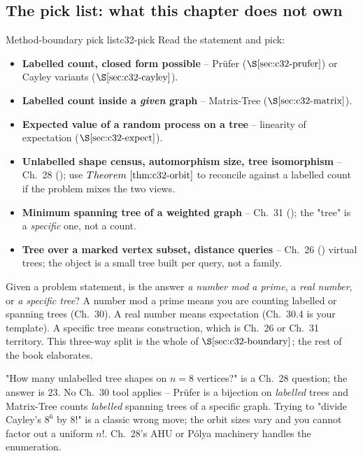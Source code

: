 \subsection{The pick list: what this chapter does not own}

\begin{definition}{Method-boundary pick list}{c32-pick}
Read the statement and pick:
\begin{itemize}[nosep]
  \item \textbf{Labelled count, closed form possible} -- Pr\"ufer
        (\(\secref{c32-prufer}\)) or Cayley variants
        (\(\secref{c32-cayley}\)).
  \item \textbf{Labelled count inside a \emph{given} graph} -- Matrix-Tree
        (\(\secref{c32-matrix}\)).
  \item \textbf{Expected value of a random process on a tree} -- linearity
        of expectation (\(\secref{c32-expect}\)).
  \item \textbf{Unlabelled shape census, automorphism size, tree isomorphism}
        -- Ch.~28 (); use \(\thmref{c32-orbit}\) to reconcile
        against a labelled count if the problem mixes the two views.
  \item \textbf{Minimum spanning tree of a weighted graph} -- Ch.~31
        (); the "tree" is a \emph{specific} one, not a count.
  \item \textbf{Tree over a marked vertex subset, distance queries} --
        Ch.~26 () virtual trees; the object is a small tree
        built per query, not a family.
\end{itemize}
\end{definition}

\begin{insightbox}
Given a problem statement, is the answer \emph{a number mod a prime}, a
\emph{real number}, or \emph{a specific tree}?  A number mod a prime means
you are counting labelled or spanning trees (Ch.~30).  A real number means
expectation (Ch.~30.4 is your template).  A specific tree means construction,
which is Ch.~26 or Ch.~31 territory.  This three-way split is the whole of
\(\secref{c32-boundary}\); the rest of the book elaborates.
\end{insightbox}

\begin{notebox}
"How many unlabelled tree shapes on \(n=8\) vertices?" is a Ch.~28 question;
the answer is \(23\).  No Ch.~30 tool applies -- Pr\"ufer is a bijection on
\emph{labelled} trees and Matrix-Tree counts \emph{labelled} spanning trees
of a specific graph.  Trying to "divide Cayley's \(8^6\) by \(8!\)" is a
classic wrong move; the orbit sizes vary and you cannot factor out a
uniform \(n!\).  Ch.~28's AHU or P\'olya machinery handles the enumeration.
\end{notebox}

